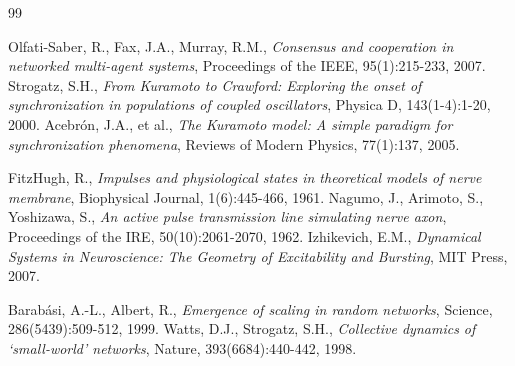 ﻿\documentclass[11pt]{article}
\begin{document}
\begin{thebibliography}{99}

 Olfati-Saber, R., Fax, J.A., Murray, R.M., \emph{Consensus and cooperation in networked multi-agent systems}, Proceedings of the IEEE, 95(1):215-233, 2007.
 Strogatz, S.H., \emph{From Kuramoto to Crawford: Exploring the onset of synchronization in populations of coupled oscillators}, Physica D, 143(1-4):1-20, 2000.
 Acebr\'on, J.A., et al., \emph{The Kuramoto model: A simple paradigm for synchronization phenomena}, Reviews of Modern Physics, 77(1):137, 2005.

 FitzHugh, R., \emph{Impulses and physiological states in theoretical models of nerve membrane}, Biophysical Journal, 1(6):445-466, 1961.
 Nagumo, J., Arimoto, S., Yoshizawa, S., \emph{An active pulse transmission line simulating nerve axon}, Proceedings of the IRE, 50(10):2061-2070, 1962.
 Izhikevich, E.M., \emph{Dynamical Systems in Neuroscience: The Geometry of Excitability and Bursting}, MIT Press, 2007.

 Barab\'asi, A.-L., Albert, R., \emph{Emergence of scaling in random networks}, Science, 286(5439):509-512, 1999.
 Watts, D.J., Strogatz, S.H., \emph{Collective dynamics of `small-world' networks}, Nature, 393(6684):440-442, 1998.


\end{thebibliography}
\end{document}
